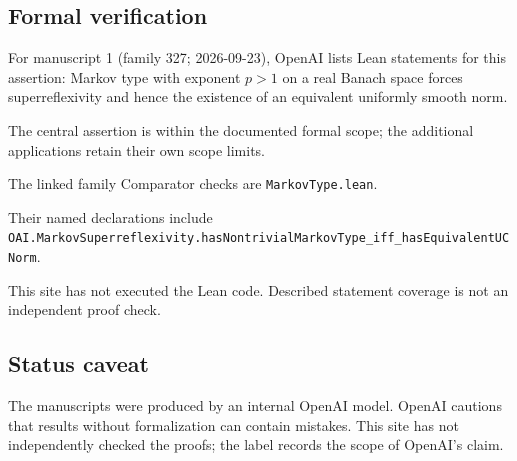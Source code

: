 \documentclass[11pt]{article}
\begin{document}
\subsection{Formal verification}
For manuscript 1 (family 327; 2026-09-23), OpenAI lists Lean statements for this assertion: Markov type with exponent $p>1$ on a real Banach space forces superreflexivity and hence the existence of an equivalent uniformly smooth norm.

The central assertion is within the documented formal scope; the additional applications retain their own scope limits.

The linked family Comparator checks are \texttt{MarkovType.lean}.

Their named declarations include \texttt{OAI.MarkovSuperreflexivity.hasNontrivialMarkovType\_iff\_hasEquivalentUCNorm}.

This site has not executed the Lean code. Described statement coverage is not an independent proof check.

\subsection{Status caveat}
The manuscripts were produced by an internal OpenAI model. OpenAI cautions that results without formalization can contain mistakes. This site has not independently checked the proofs; the label records the scope of OpenAI's claim.
\end{document}

